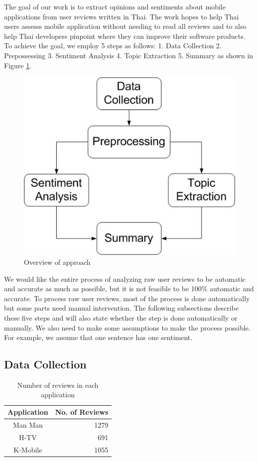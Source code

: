 
The goal of our work is to extract opinions and sentiments about mobile applications from user reviews written in Thai. The work hopes to help Thai users assesss mobile application without needing to read all reviews and to also help Thai developers pinpoint where they can improve their software products. To achieve the goal, we employ 5 steps as follows: 1. Data Collection 2. Prepossessing 3. Sentiment Analysis 4. Topic Extraction 5. Summary as shown in Figure \ref{fig:approachFig}. 

\begin{figure}[h]
	\centering
	\includegraphics[width=.6\linewidth]{Process.jpg}
	\caption{Overview of approach}
	\label{fig:approachFig}
\end{figure}

We would like the entire process of analyzing raw user reviews to be automatic and accurate as much as possible, but it is not feasible to be 100\% automatic and accurate. To process raw user reviews, most of the process is done automatically but some parts need manual intervention. The following subsections describe these five steps and will also state whether the step is done automatically or manually. We also need to make some assumptions to make the process possible. For example, we assume that one sentence has one sentiment.

\subsection{Data Collection}

\begin{table}[h]
	\caption{Number of reviews in each application}
	\label{table:NoOfReview}
	\centering
	\begin{tabular}{|c|r|}
		\hline
		\textbf{Application} & \multicolumn{1}{|c|}{\textbf{No. of Reviews}} \\
		\hline
		Man Man & 1279\\
		\hline
		H-TV & 691\\
		\hline
		K-Mobile & 1055\\
		\hline
	\end{tabular}
\end{table}

